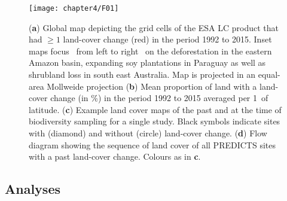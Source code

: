 \begin{figure}[htb]
\centering
\texttt{[image: chapter4/F01]}
\caption{ (\textbf{a}) Global map depicting the grid cells of the ESA LC product that had $\geq 1$ land-cover change (red) in the period 1992 to 2015. Inset maps focus \textendash\ from left to right \textendash\ on the deforestation in the eastern Amazon basin, expanding soy plantations in Paraguay as well as shrubland loss in south east Australia. Map is projected in an equal-area Mollweide projection (\textbf{b}) Mean proportion of land with a land-cover change (in \%) in the period 1992 to 2015 averaged per 1\textdegree\ of latitude. (\textbf{c}) Example land cover maps of the past and at the time of biodiversity sampling for a single study. Black symbols indicate sites with (diamond) and without (circle) land-cover change. (\textbf{d}) Flow diagram showing the sequence of land cover of all PREDICTS sites with a past land-cover change. Colours as in \textbf{c}.  }
\label{F04_01}
\end{figure}

\subsection{Analyses}
\label{C04_0203}

